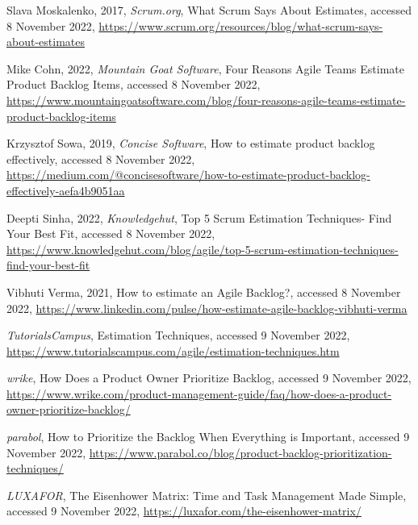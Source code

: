 \begin{latin}
	\begingroup
	\renewcommand{\section}[2]{}%
	
	\begin{thebibliography}{9}
		
		Slava Moskalenko,
		2017,
		\textit{Scrum.org},
		What Scrum Says About Estimates, 
		accessed 8 November 2022,
		\url{https://www.scrum.org/resources/blog/what-scrum-says-about-estimates}
		
		
		Mike Cohn,
		2022,
		\textit{Mountain Goat Software},
		Four Reasons Agile Teams Estimate Product Backlog Items, 
		accessed 8 November 2022,
		\url{https://www.mountaingoatsoftware.com/blog/four-reasons-agile-teams-estimate-product-backlog-items}
		
		Krzysztof Sowa,
		2019,
		\textit{Concise Software},
		How to estimate product backlog effectively, 
		accessed 8 November 2022,
		\url{https://medium.com/@concisesoftware/how-to-estimate-product-backlog-effectively-aefa4b9051aa}
		
		Deepti Sinha,
		2022,
		\textit{Knowledgehut},
		Top 5 Scrum Estimation Techniques- Find Your Best Fit, 
		accessed 8 November 2022,
		\url{https://www.knowledgehut.com/blog/agile/top-5-scrum-estimation-techniques-find-your-best-fit}
		
		Vibhuti Verma,
		2021,
		How to estimate an Agile Backlog?,
		accessed 8 November 2022,
		\url{	https://www.linkedin.com/pulse/how-estimate-agile-backlog-vibhuti-verma}

		\textit{TutorialsCampus},
		Estimation Techniques,
		accessed 9 November 2022,
		\url{	https://www.tutorialscampus.com/agile/estimation-techniques.htm}
		
		\textit{wrike},
		How Does a Product Owner Prioritize Backlog,
		accessed 9 November 2022,
		\url{	https://www.wrike.com/product-management-guide/faq/how-does-a-product-owner-prioritize-backlog/}

		\textit{parabol},
		How to Prioritize the Backlog When Everything is Important,
		accessed 9 November 2022,
		\url{	https://www.parabol.co/blog/product-backlog-prioritization-techniques/}

		\textit{LUXAFOR},
		The Eisenhower Matrix: Time and Task Management Made Simple,
		accessed 9 November 2022,
		\url{	https://luxafor.com/the-eisenhower-matrix/}
	
	\end{thebibliography}
	\endgroup
\end{latin}
